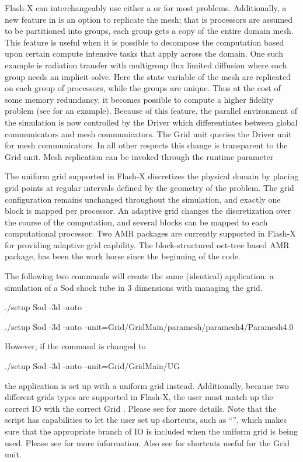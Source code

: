 Flash-X can interchangeably use either
a  or  for most
problems. Additionally, a new feature in \flashx is an option to
replicate the mesh; that is processors are assumed to be partitioned
into groups, each group gets a copy of the entire domain mesh. This
feature is useful when it is possible to decompose the computation
based upon certain compute intensive tasks that apply across the
domain. One such example is radiation transfer with multigroup flux
limited diffusion where each group needs an implicit solve. Here the 
state variable of the mesh are replicated on each group of processors,
while the groups are unique. Thus at the cost of some memory
redundancy, it becomes possible to compute a higher fidelity problem
(see  for an example). 
Because of this feature, the parallel environment of the simulation is
now controlled by the Driver which differentiates between global
communicators and mesh communicators. The Grid unit queries the Driver
unit for mesh communicators. In all other respects this change is
transparent to the Grid unit. Mesh replication can be invoked through
the runtime parameter 

The uniform grid supported in Flash-X discretizes the physical domain by
placing grid points at regular intervals defined by the geometry of
the problem. The grid configuration remains unchanged throughout the
simulation, and exactly one block is mapped per processor.
An adaptive grid changes the discretization over the course of the
computation, and several blocks can be mapped to each computational
processor. Two AMR packages are currently supported in Flash-X for
providing adaptive grid capbility. The block-structured oct-tree based
AMR package, \Paramesh%
has been the work horse since
the beginning of the code. 

\begin {flashtip}
The following two commands will create the same (identical) application:
a simulation of a Sod shock tube in 3 dimensions with 
managing the grid.
\begin{codeseg}
./setup Sod -3d -auto

./setup Sod -3d -auto -unit=Grid/GridMain/paramesh/paramesh4/Paramesh4.0
\end{codeseg}
However, if the command is changed to
\begin{codeseg}
./setup Sod -3d -auto -unit=Grid/GridMain/UG
\end{codeseg}
the application is set up with a uniform grid instead.
Additionally, because two different grids types are supported in Flash-X, the user
must match up the correct \unit{IO} \childunit with the correct \unit{Grid} \childunit.
Please
see  for more details.
Note that the  script has capabilities to let the user set up
shortcuts, such as ``'', which makes sure that the appropriate
branch of \unit{IO} is included when the uniform grid is being used. Please see
 for more information. Also see
for shortcuts useful for the Grid unit.
\end{flashtip}

